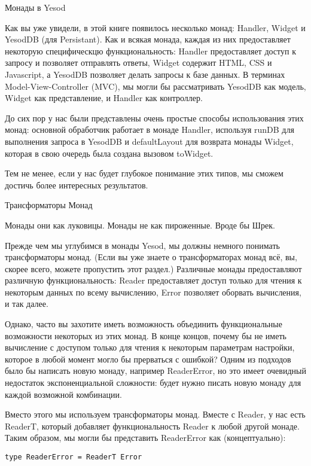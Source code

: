 Монады в Yesod

Как вы уже увидели, в этой книге появилось несколько монад: Handler, Widget и YesodDB (для Persistant). Как и всякая монада, каждая из них предоставляет некоторую специфическцю функциональность: Handler предоставляет доступ к запросу и позволяет отправлять ответы, Widget содержит HTML, CSS и Javascript, а YesodDB позволяет делать запросы к базе данных. В терминах Model-View-Controller (MVC), мы могли бы рассматривать YesodDB как модель, Widget как представление, и Handler как контроллер.

До сих пор у нас были представлены очень простые способы использования этих монад: основной обработчик работает в монаде Handler, используя runDB для выполнения запроса в YesodDB и defaultLayout для возврата монады Widget, которая в свою очередь была создана вызовом toWidget.

Тем не менее, если у нас будет глубокое понимание этих типов, мы сможем достичь более интересных результатов.

Трансформаторы Монад

Монады они как луковицы. Монады не как пироженные. Вроде бы Шрек.

Прежде чем мы углубимся в монады Yesod, мы должны немного понимать трансформаторы монад. (Если вы уже знаете о трансформаторах монад всё, вы, скорее всего, можете пропустить этот раздел.) Различные монады предоставляют различную функциональность: Reader предоставляет доступ только для чтения к некоторым данных по всему вычислению, Error позволяет оборвать вычисления, и так далее.

Однако, часто вы захотите иметь возможность объединить функциональные возможности некоторых из этих монад. В конце концов, почему бы не иметь вычисление с доступом только для чтения к некоторым параметрам настройки, которое в любой момент могло бы прерваться с ошибкой? Одним из подходов было бы написать новую монаду, например ReaderError, но это имеет очевидный недостаток экспоненциальной сложности: будет нужно писать новую монаду для каждой возможной комбинации.

Вместо этого мы используем трансформаторы монад. Вместе с Reader, у нас есть ReaderT, который добавляет функциональность Reader к любой другой монаде. Таким образом, мы могли бы представить ReaderError как (концептуально):

\begin{lstlisting}
type ReaderError = ReaderT Error
\end{lstlisting}

